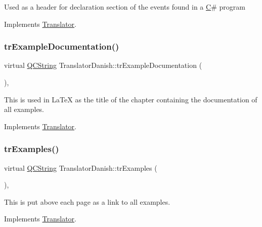 Used as a header for declaration section of the events found in a \mbox{\hyperlink{class_c}{C}}\# program 

Implements \mbox{\hyperlink{class_translator}{Translator}}.

\mbox{\label{class_translator_danish_a43cff9c74ec5524657c36e4bf7f2a33b}} 
\subsubsection{\texorpdfstring{trExampleDocumentation()}{trExampleDocumentation()}}
{\footnotesize\ttfamily virtual \mbox{\hyperlink{class_q_c_string}{Q\+C\+String}} Translator\+Danish\+::tr\+Example\+Documentation (\begin{DoxyParamCaption}{ }\end{DoxyParamCaption})\hspace{0.3cm}{\ttfamily [inline]}, {\ttfamily [virtual]}}

This is used in La\+TeX as the title of the chapter containing the documentation of all examples. 

Implements \mbox{\hyperlink{class_translator}{Translator}}.

\mbox{\label{class_translator_danish_a17e7124ddfb6c21019a0471e6ec61fcb}} 
\subsubsection{\texorpdfstring{trExamples()}{trExamples()}}
{\footnotesize\ttfamily virtual \mbox{\hyperlink{class_q_c_string}{Q\+C\+String}} Translator\+Danish\+::tr\+Examples (\begin{DoxyParamCaption}{ }\end{DoxyParamCaption})\hspace{0.3cm}{\ttfamily [inline]}, {\ttfamily [virtual]}}

This is put above each page as a link to all examples. 

Implements \mbox{\hyperlink{class_translator}{Translator}}.

\mbox{\label{class_translator_danish_ab9c30651b8adc22d073cc1ed96c1fca7}} 
